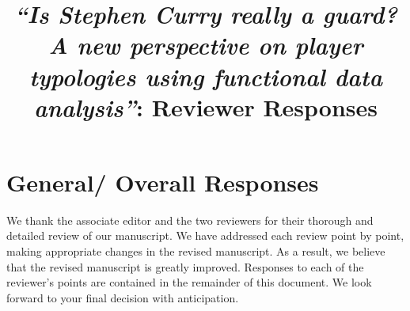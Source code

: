\documentclass[12pt,a4paper]{article}
\title{\vspace{-1cm}
\begin{flushleft} {\sffamily \emph{``Is Stephen Curry really a guard? A new perspective on player typologies using functional data analysis''}: Reviewer Responses}\end{flushleft}}
\date{\vspace{-1.7cm}\begin{flushleft}\sffamily 
\end{flushleft}}
\begin{document}
\maketitle

\section*{General/ Overall Responses}

We thank the associate editor and the two reviewers for their thorough and detailed review of our manuscript.
We have addressed each review point by point, making appropriate changes in the revised manuscript.
As a result, we believe that the revised manuscript is greatly improved.
Responses to each of the reviewer's points are contained in the remainder of this document.
We look forward to your final decision with anticipation.






\printbibliography
\end{document}
